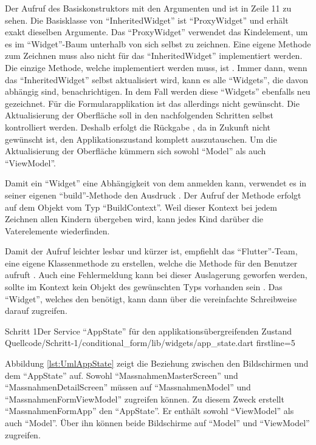 Der Aufruf des Basiskonstruktors mit den Argumenten  und  ist in Zeile 11 zu sehen.
Die Basisklasse von \enquote{InheritedWidget} ist \enquote{ProxyWidget} und erhält exakt dieselben Argumente.
 Das \enquote{ProxyWidget} verwendet das Kindelement, um es im \enquote{Widget}-Baum unterhalb von sich selbst zu zeichnen.
 Eine eigene Methode zum Zeichnen muss also nicht für das \enquote{InheritedWidget} implementiert werden.
Die einzige Methode, welche implementiert werden muss, ist  .
Immer dann, wenn das \enquote{InheritedWidget} selbst aktualisiert wird,
kann es alle \enquote{Widgets}, die davon abhängig sind, benachrichtigen.
 In dem Fall werden diese  \enquote{Widgets} ebenfalls neu gezeichnet.
Für die Formularapplikation ist das allerdings nicht gewünscht.
Die Aktualisierung der Oberfläche soll in den nachfolgenden Schritten selbst kontrolliert werden.
Deshalb erfolgt die Rückgabe , da in Zukunft nicht gewünscht ist, den Applikationszustand komplett auszutauschen.
 Um die  Aktualisierung  der Oberfläche  kümmern sich sowohl \enquote{Model} als auch \enquote{ViewModel}.

Damit ein \enquote{Widget} eine Abhängigkeit von dem  anmelden kann,
verwendet es in seiner eigenen \enquote{build}-Methode den Ausdruck .
Der Aufruf der Methode erfolgt auf dem Objekt vom Typ \enquote{BuildContext}.
Weil dieser Kontext bei jedem Zeichnen allen Kindern übergeben wird, kann jedes Kind darüber die Vaterelemente wiederfinden.

Damit der Aufruf leichter lesbar und kürzer ist, empfiehlt das \enquote{Flutter}-Team, eine eigene Klassenmethode zu erstellen, welche die Methode für den Benutzer aufruft .
Auch eine Fehlermeldung kann bei dieser Auslagerung geworfen werden, sollte im Kontext kein Objekt des gewünschten Typs vorhanden sein .
Das \enquote{Widget}, welches den  benötigt, kann dann über die vereinfachte Schreibweise  darauf zugreifen.

\begin{alexlisting}{Schritt 1}{Der Service \enquote{AppState} für den applikationsübergreifenden Zustand}
  {Quellcode/Schritt-1/conditional_form/lib/widgets/app_state.dart}
  {firstline=5}
  \label{lst:Schritt1DerServiceAppState}
\end{alexlisting}

Abbildung \ref{lst:UmlAppState} zeigt die Beziehung zwischen den Bildschirmen und dem \enquote{AppState} auf.
Sowohl \enquote{MassnahmenMasterScreen} und \enquote{MassnahmenDetailScreen} müssen auf \enquote{MassnahmenModel}
und \enquote{MassnahmenFormViewModel} zugreifen können.
Zu diesem Zweck erstellt \enquote{MassnahmenFormApp} den \enquote{AppState}.
Er enthält sowohl \enquote{ViewModel} als auch \enquote{Model}.
Über ihn können beide Bildschirme auf \enquote{Model} und \enquote{ViewModel} zugreifen.





